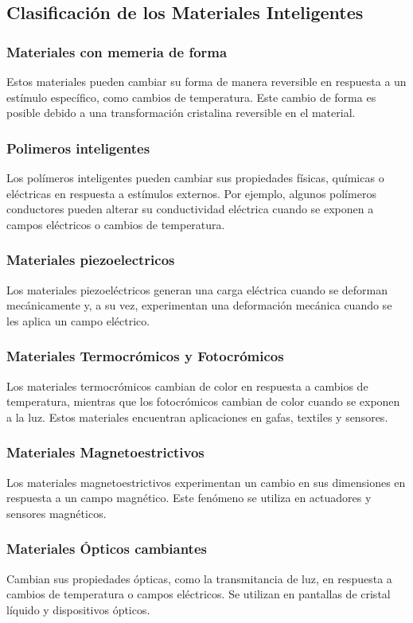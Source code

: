 \subsection{Clasificación de los Materiales Inteligentes}
    \subsubsection{Materiales con memeria de forma}
    Estos materiales pueden cambiar su forma de manera reversible en respuesta a un estímulo específico, como cambios de temperatura. Este cambio de forma es posible debido a una transformación cristalina reversible en el material.
    \subsubsection{Polimeros inteligentes}
    Los polímeros inteligentes pueden cambiar sus propiedades físicas, químicas o eléctricas en respuesta a estímulos externos. Por ejemplo, algunos polímeros conductores pueden alterar su conductividad eléctrica cuando se exponen a campos eléctricos o cambios de temperatura.
    \subsubsection{Materiales piezoelectricos}
    Los materiales piezoeléctricos generan una carga eléctrica cuando se deforman mecánicamente y, a su vez, experimentan una deformación mecánica cuando se les aplica un campo eléctrico.
    \subsubsection{Materiales Termocrómicos y Fotocrómicos}
    Los materiales termocrómicos cambian de color en respuesta a cambios de temperatura, mientras que los fotocrómicos cambian de color cuando se exponen a la luz. Estos materiales encuentran aplicaciones en gafas, textiles y sensores.
    \subsubsection{Materiales Magnetoestrictivos}
    Los materiales magnetoestrictivos experimentan un cambio en sus dimensiones en respuesta a un campo magnético. Este fenómeno se utiliza en actuadores y sensores magnéticos.
    \subsubsection{Materiales Ópticos cambiantes}
    Cambian sus propiedades ópticas, como la transmitancia de luz, en respuesta a cambios de temperatura o campos eléctricos. Se utilizan en pantallas de cristal líquido y dispositivos ópticos.
